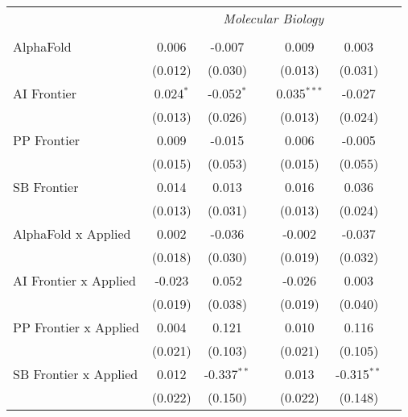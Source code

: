 \begin{tabular}{lcccccc}
 & \multicolumn{6}{c}{\textit{Molecular Biology}} \\ \\
   AlphaFold                      & 0.006       & -0.007        &                & 0.009         & 0.003         &   \\   
                                  & (0.012)     & (0.030)       &                & (0.013)       & (0.031)       &   \\   
   AI Frontier                    & 0.024$^{*}$ & -0.052$^{*}$  &                & 0.035$^{***}$ & -0.027        &   \\   
                                  & (0.013)     & (0.026)       &                & (0.013)       & (0.024)       &   \\   
   PP Frontier                    & 0.009       & -0.015        &                & 0.006         & -0.005        &   \\   
                                  & (0.015)     & (0.053)       &                & (0.015)       & (0.055)       &   \\   
   SB Frontier                    & 0.014       & 0.013         &                & 0.016         & 0.036         &   \\   
                                  & (0.013)     & (0.031)       &                & (0.013)       & (0.024)       &   \\   
   AlphaFold x Applied            & 0.002       & -0.036        &                & -0.002        & -0.037        &   \\   
                                  & (0.018)     & (0.030)       &                & (0.019)       & (0.032)       &   \\   
   AI Frontier x Applied          & -0.023      & 0.052         &                & -0.026        & 0.003         &   \\   
                                  & (0.019)     & (0.038)       &                & (0.019)       & (0.040)       &   \\   
   PP Frontier x Applied          & 0.004       & 0.121         &                & 0.010         & 0.116         &   \\   
                                  & (0.021)     & (0.103)       &                & (0.021)       & (0.105)       &   \\   
   SB Frontier x Applied          & 0.012       & -0.337$^{**}$ &                & 0.013         & -0.315$^{**}$ &   \\   
                                  & (0.022)     & (0.150)       &                & (0.022)       & (0.148)       &   \\   

\end{tabular}

